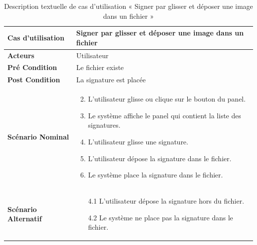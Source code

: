 
\begin{longtable}{|p{5cm}|p{10cm}|}
  \caption{Description textuelle de cas d'utilisation « Signer par glisser et déposer une image dans un fichier »} \label{tab:description-textuelle-de-cas-d-utilisation-signer-par-glisser-et-deposer-une-image-dans-un-fichier} \\
\hline
\textbf{Cas d'utilisation}&Signer par glisser et déposer une image dans un fichier\\
\hline
\textbf{Acteurs}&Utilisateur\\
\hline
\textbf{Pré Condition}&Le fichier existe\\
\hline
\textbf{Post Condition}&La signature est placée\\
\hline
\textbf{Scénario Nominal}&
\vspace{-\baselineskip}
\begin{enumerate}
    \setcounter{enumi}{1}
    \item L'utilisateur glisse ou clique sur le bouton du panel.
    \item Le système affiche le panel qui contient la liste des signatures.
    \item L'utilisateur glisse une signature.
    \item L'utilisateur dépose la signature dans le fichier.
    \item Le système place la signature dans le fichier.
\end{enumerate}\\
\hline
\textbf{Scénario Alternatif}&
\vspace{-\baselineskip}
\begin{enumerate}
    \item [4.1] L'utilisateur dépose la signature hors du fichier.
    \item [4.2] Le système ne place pas la signature dans le fichier.
\end{enumerate}\\
\hline

\end{longtable}


